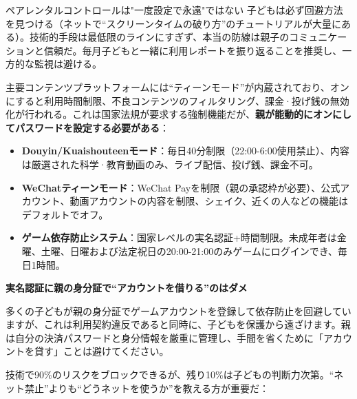 \begin{tcbwarn}{ペアレンタルコントロールは"一度設定で永遠"ではない}
子どもは必ず回避方法を見つける（ネットで“スクリーンタイムの破り方”のチュートリアルが大量にある）。技術的手段は最低限のラインにすぎず、本当の防線は親子のコミュニケーションと信頼だ。毎月子どもと一緒に利用レポートを振り返ることを推奨し、一方的な監視は避ける。

\end{tcbwarn}


主要コンテンツプラットフォームには“ティーンモード”が内蔵されており、オンにすると利用時間制限、不良コンテンツのフィルタリング、課金·投げ銭の無効化が行われる。これは国家法規が要求する強制機能だが、\textbf{親が能動的にオンにしてパスワードを設定する必要がある}：

\begin{itemize}
  \item \textbf{Douyin/Kuaishouteenモード}：毎日40分制限（22:00-6:00使用禁止）、内容は厳選された科学·教育動画のみ、ライブ配信、投げ銭、課金不可。
  \item \textbf{WeChatティーンモード}：WeChat Payを制限（親の承認枠が必要）、公式アカウント、動画アカウントの内容を制限、シェイク、近くの人などの機能はデフォルトでオフ。
  \item \textbf{ゲーム依存防止システム}：国家レベルの実名認証+時間制限。未成年者は金曜、土曜、日曜および法定祝日の20:00-21:00のみゲームにログインでき、毎日1時間。
\end{itemize}

\textbf{実名認証に親の身分証で“アカウントを借りる”のはダメ}\par

多くの子どもが親の身分証でゲームアカウントを登録して依存防止を回避していますが、これは利用契約違反であると同時に、子どもを保護から遠ざけます。親は自分の決済パスワードと身分情報を厳重に管理し、手間を省くために「アカウントを貸す」ことは避けてください。


技術で90\%のリスクをブロックできるが、残り10\%は子どもの判断力次第。“ネット禁止”よりも“どうネットを使うか”を教える方が重要だ：

